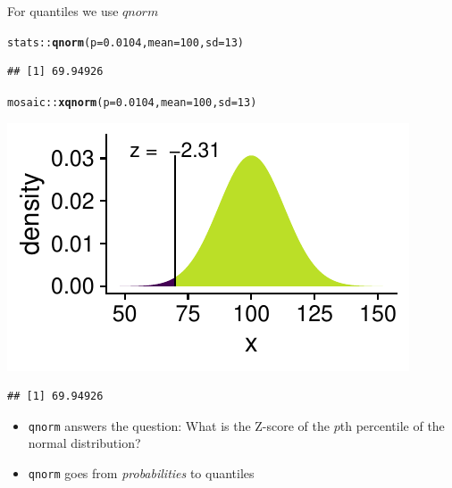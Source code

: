 \documentclass[10pt]{beamer}\usepackage[]{graphicx}\usepackage[]{color}
\makeatletter
\newcommand{\hlnum}[1]{\textcolor[rgb]{0.686,0.059,0.569}{#1}}%
\newcommand{\hlopt}[1]{\textcolor[rgb]{0,0,0}{#1}}%
\newcommand{\hlstd}[1]{\textcolor[rgb]{0.345,0.345,0.345}{#1}}%
\newcommand{\hlkwc}[1]{\textcolor[rgb]{0.333,0.667,0.333}{#1}}%
\newcommand{\hlkwd}[1]{\textcolor[rgb]{0.737,0.353,0.396}{\textbf{#1}}}%
\newenvironment{kframe}{%
 \def\at@end@of@kframe{}%
 \ifinner\ifhmode%
  \def\at@end@of@kframe{\end{minipage}}%
  \begin{minipage}{\columnwidth}%
 \fi\fi%
 \def\FrameCommand##1{\hskip\@totalleftmargin \hskip-\fboxsep
 \colorbox{shadecolor}{##1}\hskip-\fboxsep
     \hskip-\linewidth \hskip-\@totalleftmargin \hskip\columnwidth}%
 \MakeFramed {\advance\hsize-\width
   \@totalleftmargin\z@ \linewidth\hsize
   \@setminipage}}%
 {\par\unskip\endMakeFramed%
 \at@end@of@kframe}
\newenvironment{knitrout}{}{} %
\makeatother
\begin{document}
\begin{frame}[fragile]{For quantiles we use $qnorm$}
	
	
	
\begin{knitrout}\tiny
{}\color{fgcolor}\begin{kframe}
\begin{alltt}
\hlstd{stats}\hlopt{::}\hlkwd{qnorm}\hlstd{(}\hlkwc{p} \hlstd{=} \hlnum{0.0104}\hlstd{,} \hlkwc{mean} \hlstd{=} \hlnum{100}\hlstd{,} \hlkwc{sd} \hlstd{=} \hlnum{13}\hlstd{)}
\end{alltt}
\begin{verbatim}
## [1] 69.94926
\end{verbatim}
\end{kframe}
\end{knitrout}
	
	\pause 
	
\begin{knitrout}\tiny
{}\color{fgcolor}\begin{kframe}
\begin{alltt}
\hlstd{mosaic}\hlopt{::}\hlkwd{xqnorm}\hlstd{(}\hlkwc{p} \hlstd{=} \hlnum{0.0104}\hlstd{,} \hlkwc{mean} \hlstd{=} \hlnum{100}\hlstd{,} \hlkwc{sd} \hlstd{=} \hlnum{13}\hlstd{)}
\end{alltt}
\end{kframe}

{\centering \includegraphics[width=0.6\linewidth]{figure/probs5-1} 

}


\begin{kframe}\begin{verbatim}
## [1] 69.94926
\end{verbatim}
\end{kframe}
\end{knitrout}
	
	\pause 
	
	\small{
		\begin{itemize}
			\item \texttt{qnorm} answers the question: What is the Z-score of the $p$th percentile of the normal distribution?
			
			\item \texttt{qnorm} goes from \textit{probabilities} to quantiles 
		\end{itemize}
	}
\end{frame}
\end{document}
